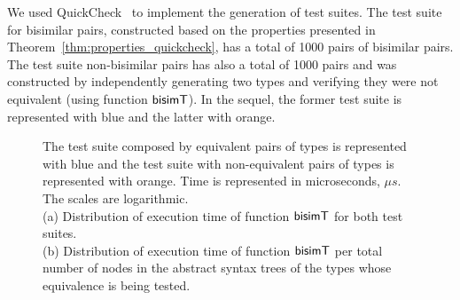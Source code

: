We used QuickCheck~\cite{DBLP:conf/icfp/ClaessenH00} to implement the
generation of test suites. The test suite for bisimilar pairs, constructed
based on the properties presented in Theorem~\ref{thm:properties_quickcheck},
has a total of 1000 pairs of bisimilar pairs. The test suite non-bisimilar
pairs has also a total of 1000 pairs and was 
constructed by independently generating two types and verifying they were
not equivalent (using function $\mathsf{bisimT}$). In the sequel, the former test suite
is represented with blue and the latter with orange.


\begin{figure}[h!]
    \centering
    \caption{The test suite composed by equivalent pairs of types is represented with blue and the
    test suite with non-equivalent pairs of types is represented with orange. Time is represented
    in microseconds, $\mu s$. The scales are logarithmic.\\
    (a) Distribution of execution time of function $\mathsf{bisimT}$ for both test suites.\\
    (b) Distribution of execution time of function $\mathsf{bisimT}$ per total number of nodes 
    in the abstract syntax trees of the types whose equivalence is being tested.}%
    \label{fig:results}%
\end{figure}

